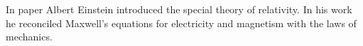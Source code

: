 \documentclass[onecolumn,amsmath,amssymb]{revtex4}
\begin{document}
In paper \cite{einstein1905elektrodynamik} Albert Einstein introduced the special theory of relativity.
In his work he reconciled Maxwell's equations for electricity and magnetism with the laws of mechanics.



\end{document}
